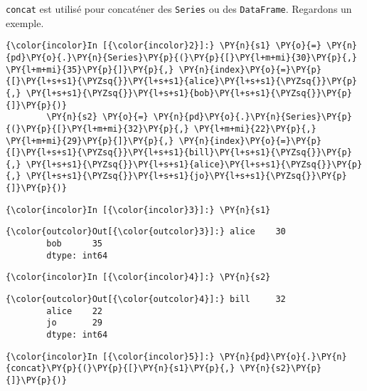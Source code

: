     \texttt{concat} est utilisé pour concaténer des \texttt{Series} ou des
\texttt{DataFrame}. Regardons un exemple.

    \begin{Verbatim}[commandchars=\\\{\}]
{\color{incolor}In [{\color{incolor}2}]:} \PY{n}{s1} \PY{o}{=} \PY{n}{pd}\PY{o}{.}\PY{n}{Series}\PY{p}{(}\PY{p}{[}\PY{l+m+mi}{30}\PY{p}{,} \PY{l+m+mi}{35}\PY{p}{]}\PY{p}{,} \PY{n}{index}\PY{o}{=}\PY{p}{[}\PY{l+s+s1}{\PYZsq{}}\PY{l+s+s1}{alice}\PY{l+s+s1}{\PYZsq{}}\PY{p}{,} \PY{l+s+s1}{\PYZsq{}}\PY{l+s+s1}{bob}\PY{l+s+s1}{\PYZsq{}}\PY{p}{]}\PY{p}{)}
        \PY{n}{s2} \PY{o}{=} \PY{n}{pd}\PY{o}{.}\PY{n}{Series}\PY{p}{(}\PY{p}{[}\PY{l+m+mi}{32}\PY{p}{,} \PY{l+m+mi}{22}\PY{p}{,} \PY{l+m+mi}{29}\PY{p}{]}\PY{p}{,} \PY{n}{index}\PY{o}{=}\PY{p}{[}\PY{l+s+s1}{\PYZsq{}}\PY{l+s+s1}{bill}\PY{l+s+s1}{\PYZsq{}}\PY{p}{,} \PY{l+s+s1}{\PYZsq{}}\PY{l+s+s1}{alice}\PY{l+s+s1}{\PYZsq{}}\PY{p}{,} \PY{l+s+s1}{\PYZsq{}}\PY{l+s+s1}{jo}\PY{l+s+s1}{\PYZsq{}}\PY{p}{]}\PY{p}{)}
\end{Verbatim}


    \begin{Verbatim}[commandchars=\\\{\}]
{\color{incolor}In [{\color{incolor}3}]:} \PY{n}{s1}
\end{Verbatim}


\begin{Verbatim}[commandchars=\\\{\}]
{\color{outcolor}Out[{\color{outcolor}3}]:} alice    30
        bob      35
        dtype: int64
\end{Verbatim}
            
    \begin{Verbatim}[commandchars=\\\{\}]
{\color{incolor}In [{\color{incolor}4}]:} \PY{n}{s2}
\end{Verbatim}


\begin{Verbatim}[commandchars=\\\{\}]
{\color{outcolor}Out[{\color{outcolor}4}]:} bill     32
        alice    22
        jo       29
        dtype: int64
\end{Verbatim}
            
    \begin{Verbatim}[commandchars=\\\{\}]
{\color{incolor}In [{\color{incolor}5}]:} \PY{n}{pd}\PY{o}{.}\PY{n}{concat}\PY{p}{(}\PY{p}{[}\PY{n}{s1}\PY{p}{,} \PY{n}{s2}\PY{p}{]}\PY{p}{)}
\end{Verbatim}


